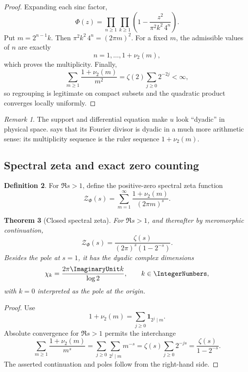 \documentclass[11pt,oneside]{article}
\newtheorem{theorem}{Theorem}[section]
\theoremstyle{definition}
\newtheorem{definition}[theorem]{Definition}
\theoremstyle{remark}
\newtheorem{remark}[theorem]{Remark}
\begin{document}
\begin{proof}
Expanding each sinc factor,
\[
 \Phi(z)=
 \prod_{n\geq1}\prod_{k\geq1}
 \left(1-\frac{z^2}{\pi^2k^2\,4^n}\right).
\]
Put \(m=2^{n-1}k\).  Then
\(\pi^2k^2\,4^n=(2\pi m)^2\).  For a fixed \(m\), the admissible values of
\(n\) are exactly
\[
 n=1,\ldots,1+\nu_2(m),
\]
which proves the multiplicity.  Finally,
\[
 \sum_{m\geq1}\frac{1+\nu_2(m)}{m^2}
 =\zeta(2)\sum_{j\geq0}2^{-2j}<\infty,
\]
so regrouping is legitimate on compact subsets and the quadratic product
converges locally uniformly.
\end{proof}

\begin{remark}
The support and differential equation make \(u\) look ``dyadic'' in physical
space.   says that its Fourier divisor is dyadic in a much
more arithmetic sense: its multiplicity sequence is the ruler sequence
\(1+\nu_2(m)\).
\end{remark}

\subsection{Spectral zeta and exact zero counting}

\begin{definition}
For \(\Re s>1\), define the positive-zero spectral zeta function
\begin{equation}
 \mathcal Z_\Phi(s)
 =\sum_{m=1}^{\infty}
   \frac{1+\nu_2(m)}{(2\pi m)^s}.
 \label{eq:spectral-zeta-def}
\end{equation}
\end{definition}

\begin{theorem}[Closed spectral zeta]
\label{thm:spectral-zeta}
For \(\Re s>1\), and thereafter by meromorphic continuation,
\begin{equation}
 \boxed{\displaystyle
 \mathcal Z_\Phi(s)
 =\frac{\zeta(s)}{(2\pi)^s(1-2^{-s})}.}
 \label{eq:spectral-zeta}
\end{equation}
Besides the pole at \(s=1\), it has the dyadic complex dimensions
\begin{equation}
 \chi_k=\frac{2\pi\ImaginaryUnit k}{\log2},
 \qquad k\in\IntegerNumbers,
 \label{eq:complex-dimensions}
\end{equation}
with \(k=0\) interpreted as the pole at the origin.
\end{theorem}

\begin{proof}
Use
\[
 1+\nu_2(m)=\sum_{j\geq0}\mathbf1_{2^j\mid m}.
\]
Absolute convergence for \(\Re s>1\) permits the interchange
\[
 \sum_{m\geq1}\frac{1+\nu_2(m)}{m^s}
 =\sum_{j\geq0}\sum_{2^j\mid m}m^{-s}
 =\zeta(s)\sum_{j\geq0}2^{-js}
 =\frac{\zeta(s)}{1-2^{-s}}.
\]
The asserted continuation and poles follow from the right-hand side.
\end{proof}
\end{document}

